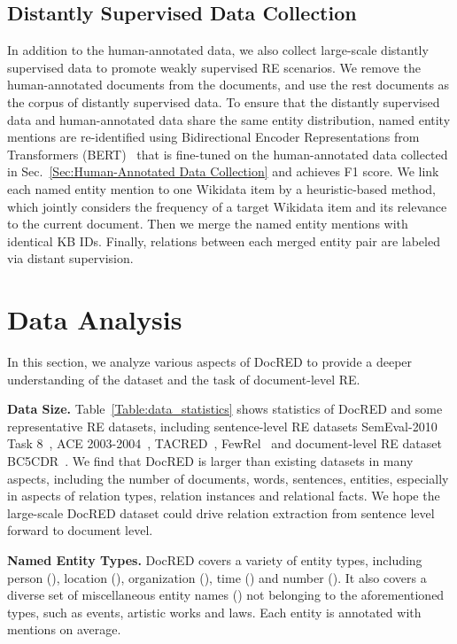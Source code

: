 \documentclass[11pt,a4paper]{article}
\begin{document}
\subsection{Distantly Supervised Data Collection}
\label{Sec:Distantly Supervised Data Collection}
In addition to the human-annotated data, we also collect large-scale distantly supervised data to promote weakly supervised RE scenarios. We remove the  human-annotated documents from the  documents, and use the rest  documents as the corpus of distantly supervised data. To ensure that the distantly supervised data and human-annotated data share the same entity distribution, named entity mentions are re-identified using Bidirectional Encoder Representations from Transformers (BERT)~\cite{devlin2018bert} that is fine-tuned  on the human-annotated data collected in Sec.~\ref{Sec:Human-Annotated Data Collection} and achieves  F1 score. We link each named entity mention to one Wikidata item by a heuristic-based method, which jointly considers the frequency of a target Wikidata item and its relevance to the current document. Then we merge the named entity mentions with identical KB IDs. Finally, relations between each merged entity pair are labeled via distant supervision.


\section{Data Analysis}
\label{Sec:Data Analysis}
In this section, we analyze various aspects of DocRED to provide a deeper understanding of the dataset and the task of document-level RE.


\smallskip
\noindent
\textbf{Data Size.} Table~\ref{Table:data_statistics} shows statistics of DocRED and some representative RE datasets, including sentence-level RE datasets SemEval-2010 Task 8~\cite{hendrickx2009semeval}, ACE 2003-2004~\cite{doddington2004automatic}, TACRED~\cite{zhang2017position}, FewRel~\cite{han2018fewrel} and document-level RE dataset BC5CDR~\cite{li2016biocreative}. We find that DocRED is larger than existing datasets in many aspects, including the number of documents, words, sentences, entities, especially in aspects of relation types, relation instances and relational facts. We hope the large-scale DocRED dataset could drive relation extraction from sentence level forward to document level.



\smallskip
\noindent
\textbf{Named Entity Types.}
DocRED covers a variety of entity types, including person (), location (), organization (), time () and number (). It also covers  a diverse set of miscellaneous entity names () not belonging to the aforementioned types, such as events, artistic works and laws. Each entity is annotated with  mentions on average.
\end{document}
